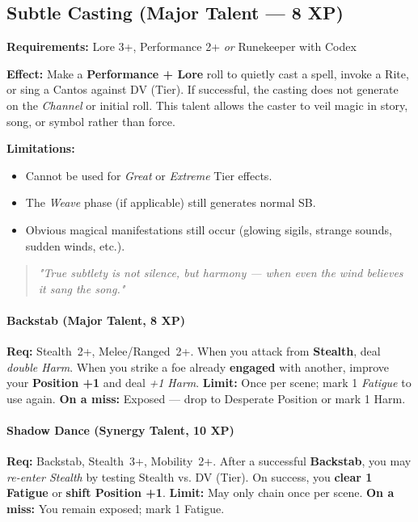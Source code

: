 \subsection*{Subtle Casting (Major Talent --- 8 XP)}

\textbf{Requirements:} Lore 3+, Performance 2+ \emph{or} Runekeeper with Codex

\textbf{Effect:} Make a \textbf{Performance + Lore} roll to quietly cast a spell, invoke a Rite, or sing a Cantos against DV (Tier). 
If successful, the casting does not generate  on the \emph{Channel} or initial roll. 
This talent allows the caster to veil magic in story, song, or symbol rather than force.

\textbf{Limitations:}
\begin{itemize}
  \item Cannot be used for \emph{Great} or \emph{Extreme} Tier effects.
  \item The \emph{Weave} phase (if applicable) still generates normal SB.
  \item Obvious magical manifestations still occur (glowing sigils, strange sounds, sudden winds, etc.).
\end{itemize}

\begin{quote}
\emph{"True subtlety is not silence, but harmony --- when even the wind believes it sang the song."}
\end{quote}


\paragraph{Backstab (Major Talent, 8 XP)} 
\textbf{Req:} Stealth~2+, Melee/Ranged~2+.  
When you attack from \textbf{Stealth}, deal \emph{double Harm}.  
When you strike a foe already \textbf{engaged} with another, improve your \textbf{Position +1} and deal \emph{+1 Harm}.  
\textbf{Limit:} Once per scene; mark 1 \emph{Fatigue} to use again.  
\textbf{On a miss:} Exposed --- drop to Desperate Position or mark 1 Harm.

\paragraph{Shadow Dance (Synergy Talent, 10 XP)} 
\textbf{Req:} Backstab, Stealth~3+, Mobility~2+.  
After a successful \textbf{Backstab}, you may \emph{re-enter Stealth} by testing Stealth vs. DV (Tier).  
On success, you \textbf{clear 1 Fatigue} or \textbf{shift Position +1}.  
\textbf{Limit:} May only chain once per scene.  
\textbf{On a miss:} You remain exposed; mark 1 Fatigue.

